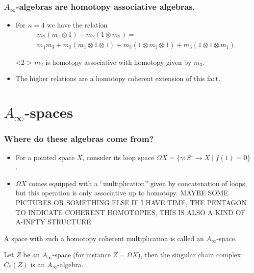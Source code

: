 \documentclass{beamer}
\theoremstyle{definition}
\begin{document}
\begin{frame}
\frametitle{$A_\infty$-algebras are homotopy associative algebras.}
\begin{itemize}
\item<1-> For $n=4$ we have the relation
\begin{align*}
&m_2(m_1\otimes 1)-m_2(1\otimes m_2)=\\ %
&m_1m_3+m_3(m_1\otimes 1\otimes 1)+m_3(1\otimes m_1\otimes 1)+m_3(1\otimes 1\otimes m_1)
\end{align*}
\item[]<2-> $m_2$ is homotopy associative with homotopy given by $m_3$. %
\item<3-> The higher relations are a homotopy coherent extension of this fact. %
\end{itemize}
\end{frame}

\section{$A_\infty$-spaces}
\begin{frame}
\frametitle{Where do these algebras come from?} 
\begin{itemize}
\item<1-> For a pointed space $X$, consider its loop space $\Omega X=\{\gamma:S^1\to X\mid f(1)=0\}$.
\item<2-> $\Omega X$ comes equipped with a ``multiplication'' given by concatenation of loops, but this operation is only associative up to homotopy. MAYBE SOME PICTURES OR SOMETHING ELSE IF I HAVE TIME, THE PENTAGON TO INDICATE COHERENT HOMOTOPIES, THIS IS ALSO A KIND OF A-INFTY STRUCTURE
\end{itemize}
\end{frame}

\begin{frame}
A space with such a homotopy coherent multiplication is called an $A_\infty$-space.\pause
\begin{theorem}[P. May]%
Let $Z$ be an $A_\infty$-space (for instance $Z=\Omega X$), then the singular chain complex $C_*(Z)$ is an $A_\infty$-algebra.
\end{theorem}
\end{frame}
\end{document}
